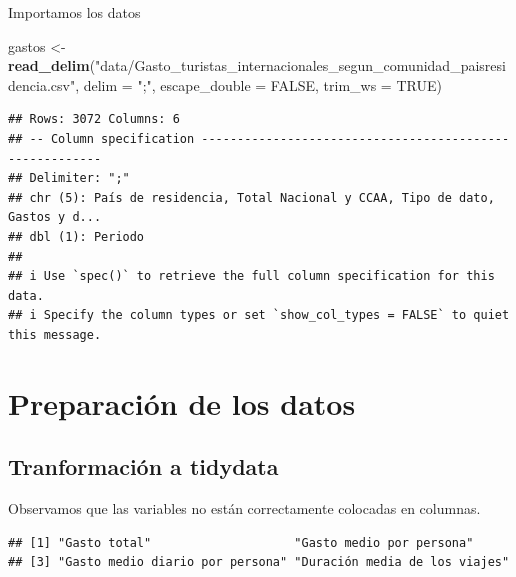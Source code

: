 \documentclass[data,article,submit,moreauthors,pdftex]{Definitions/mdpi}
\newenvironment{Shaded}{\begin{snugshade}}{\end{snugshade}}
\newcommand{\AttributeTok}[1]{\textcolor[rgb]{0.13,0.29,0.53}{#1}}
\newcommand{\CommentTok}[1]{\textcolor[rgb]{0.56,0.35,0.01}{\textit{#1}}}
\newcommand{\ConstantTok}[1]{\textcolor[rgb]{0.56,0.35,0.01}{#1}}
\newcommand{\FunctionTok}[1]{\textcolor[rgb]{0.13,0.29,0.53}{\textbf{#1}}}
\newcommand{\NormalTok}[1]{#1}
\newcommand{\OtherTok}[1]{\textcolor[rgb]{0.56,0.35,0.01}{#1}}
\newcommand{\SpecialCharTok}[1]{\textcolor[rgb]{0.81,0.36,0.00}{\textbf{#1}}}
\newcommand{\StringTok}[1]{\textcolor[rgb]{0.31,0.60,0.02}{#1}}
\begin{document}
Importamos los datos

\begin{Shaded}
\begin{Highlighting}[]
\NormalTok{gastos }\OtherTok{\textless{}{-}} \FunctionTok{read\_delim}\NormalTok{(}\StringTok{"data/Gasto\_turistas\_internacionales\_segun\_comunidad\_paisresidencia.csv"}\NormalTok{,}
    \AttributeTok{delim =} \StringTok{";"}\NormalTok{, }\AttributeTok{escape\_double =} \ConstantTok{FALSE}\NormalTok{, }\AttributeTok{trim\_ws =} \ConstantTok{TRUE}\NormalTok{)}
\end{Highlighting}
\end{Shaded}

\begin{verbatim}
## Rows: 3072 Columns: 6
## -- Column specification --------------------------------------------------------
## Delimiter: ";"
## chr (5): País de residencia, Total Nacional y CCAA, Tipo de dato, Gastos y d...
## dbl (1): Periodo
## 
## i Use `spec()` to retrieve the full column specification for this data.
## i Specify the column types or set `show_col_types = FALSE` to quiet this message.
\end{verbatim}

\section{Preparación de los datos}\label{preparaciuxf3n-de-los-datos}

\subsection{Tranformación a tidydata}\label{tranformaciuxf3n-a-tidydata}

Observamos que las variables no están correctamente colocadas en
columnas.

\begin{Shaded}
\end{Shaded}

\begin{verbatim}
## [1] "Gasto total"                    "Gasto medio por persona"       
## [3] "Gasto medio diario por persona" "Duración media de los viajes"
\end{verbatim}
\end{document}
